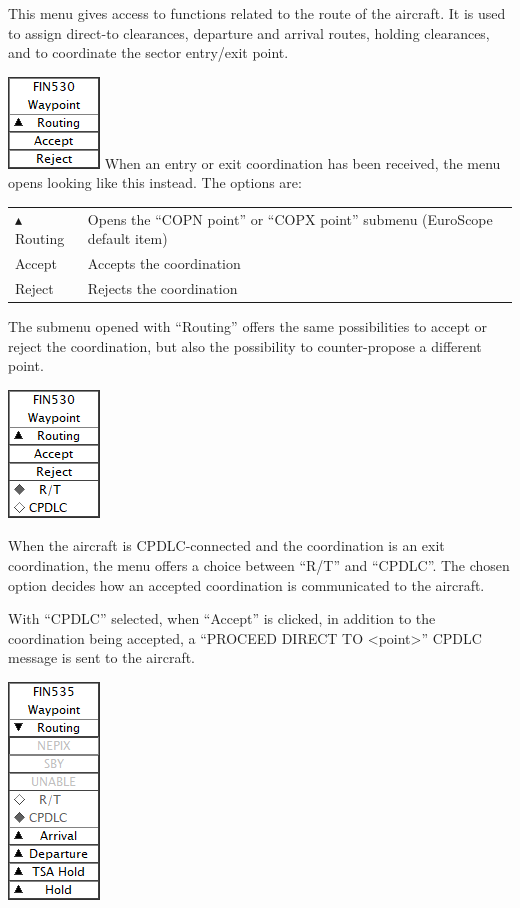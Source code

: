 \documentclass[11pt,a4paper]{memoir}
\begin{document}
This menu gives access to functions related to the route of the aircraft. It is used to assign direct-to clearances, departure and arrival routes, holding clearances, and to coordinate the sector entry/exit point.

\includegraphics{img/wptyn.png}
When an entry or exit coordination has been received, the menu opens looking like this instead. The options are:

\begin{tabular}{l l}
$\blacktriangle$ Routing    & Opens the “COPN point” or “COPX point” submenu (EuroScope default item)
\\Accept                      & Accepts the coordination
\\Reject                      & Rejects the coordination
\end{tabular}

The submenu opened with “Routing” offers the same possibilities to accept or reject the coordination, but also the possibility to counter-propose a different point.

\includegraphics{img/wptdl.png}

When the aircraft is CPDLC-connected and the coordination is an exit coordination, the menu offers a choice between “R/T” and “CPDLC”. The chosen option decides how an accepted coordination is communicated to the aircraft.

With “CPDLC” selected, when “Accept” is clicked, in addition to the coordination being accepted, a “PROCEED DIRECT TO <point>” CPDLC message is sent to the aircraft.

\includegraphics{img/wptroute.png}
\end{document}

